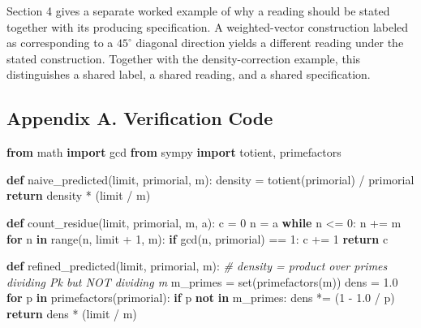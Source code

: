 \documentclass[
]{article}
\newenvironment{Shaded}{}{}
\newcommand{\BuiltInTok}[1]{\textcolor[rgb]{0.00,0.50,0.00}{#1}}
\newcommand{\CommentTok}[1]{\textcolor[rgb]{0.38,0.63,0.69}{\textit{#1}}}
\newcommand{\ControlFlowTok}[1]{\textcolor[rgb]{0.00,0.44,0.13}{\textbf{#1}}}
\newcommand{\DecValTok}[1]{\textcolor[rgb]{0.25,0.63,0.44}{#1}}
\newcommand{\FloatTok}[1]{\textcolor[rgb]{0.25,0.63,0.44}{#1}}
\newcommand{\ImportTok}[1]{\textcolor[rgb]{0.00,0.50,0.00}{\textbf{#1}}}
\newcommand{\KeywordTok}[1]{\textcolor[rgb]{0.00,0.44,0.13}{\textbf{#1}}}
\newcommand{\NormalTok}[1]{#1}
\newcommand{\OperatorTok}[1]{\textcolor[rgb]{0.40,0.40,0.40}{#1}}
\begin{document}
Section 4 gives a separate worked example of why a reading should be
stated together with its producing specification. A weighted-vector
construction labeled as corresponding to a \(45^\circ\) diagonal direction
yields a different reading under the stated construction. Together with
the density-correction example, this distinguishes a shared label, a
shared reading, and a shared specification.

\subsection{Appendix A. Verification
Code}\label{appendix-a.-verification-code}

\begin{Shaded}
\begin{Highlighting}[]
\ImportTok{from}\NormalTok{ math }\ImportTok{import}\NormalTok{ gcd}
\ImportTok{from}\NormalTok{ sympy }\ImportTok{import}\NormalTok{ totient, primefactors}

\KeywordTok{def}\NormalTok{ naive\_predicted(limit, primorial, m):}
\NormalTok{    density }\OperatorTok{=}\NormalTok{ totient(primorial) }\OperatorTok{/}\NormalTok{ primorial}
    \ControlFlowTok{return}\NormalTok{ density }\OperatorTok{*}\NormalTok{ (limit }\OperatorTok{/}\NormalTok{ m)}

\KeywordTok{def}\NormalTok{ count\_residue(limit, primorial, m, a):}
\NormalTok{    c }\OperatorTok{=} \DecValTok{0}
\NormalTok{    n }\OperatorTok{=}\NormalTok{ a}
    \ControlFlowTok{while}\NormalTok{ n }\OperatorTok{\textless{}=} \DecValTok{0}\NormalTok{:}
\NormalTok{        n }\OperatorTok{+=}\NormalTok{ m}
    \ControlFlowTok{for}\NormalTok{ n }\KeywordTok{in} \BuiltInTok{range}\NormalTok{(n, limit }\OperatorTok{+} \DecValTok{1}\NormalTok{, m):}
        \ControlFlowTok{if}\NormalTok{ gcd(n, primorial) }\OperatorTok{==} \DecValTok{1}\NormalTok{:}
\NormalTok{            c }\OperatorTok{+=} \DecValTok{1}
    \ControlFlowTok{return}\NormalTok{ c}

\KeywordTok{def}\NormalTok{ refined\_predicted(limit, primorial, m):}
    \CommentTok{\# density = product over primes dividing Pk but NOT dividing m}
\NormalTok{    m\_primes }\OperatorTok{=} \BuiltInTok{set}\NormalTok{(primefactors(m))}
\NormalTok{    dens }\OperatorTok{=} \FloatTok{1.0}
    \ControlFlowTok{for}\NormalTok{ p }\KeywordTok{in}\NormalTok{ primefactors(primorial):}
        \ControlFlowTok{if}\NormalTok{ p }\KeywordTok{not} \KeywordTok{in}\NormalTok{ m\_primes:}
\NormalTok{            dens }\OperatorTok{*=}\NormalTok{ (}\DecValTok{1} \OperatorTok{{-}} \FloatTok{1.0} \OperatorTok{/}\NormalTok{ p)}
    \ControlFlowTok{return}\NormalTok{ dens }\OperatorTok{*}\NormalTok{ (limit }\OperatorTok{/}\NormalTok{ m)}
\end{Highlighting}
\end{Shaded}
\end{document}
